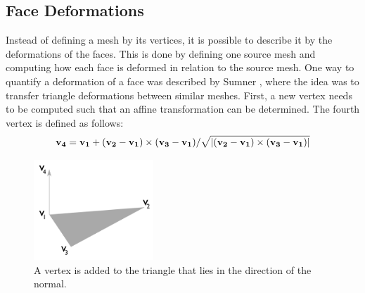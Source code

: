 \subsection{Face Deformations}
\label{faceDeform}
Instead of defining a mesh by its vertices, it is possible to describe it by the deformations of the faces. This is done by defining one source mesh and computing how each face is deformed in relation to the source mesh. One way to quantify a deformation of a face was described by Sumner \cite{sumner2004deformation}, where the idea was to transfer triangle deformations between similar meshes. First, a new vertex needs to be computed such that an affine transformation can be determined. The fourth vertex is defined as follows:
\begin{gather}
  \mathbf{v_4} = \mathbf{v_1} + (\mathbf{v_2} - \mathbf{v_1})\times(\mathbf{v_3}-\mathbf{v_1})/\sqrt{\lvert(\mathbf{v_2}-\mathbf{v_1})\times(\mathbf{v_3}-\mathbf{v_1})\rvert} \label{normalequation}
\end{gather}
\begin{figure}[h]
\centering
\includegraphics[width=0.4\textwidth]{figures/normal}
\caption[Diagram point on normal]{A vertex is added to the triangle that lies in the direction of the normal.}
\label{fig:normal}
\end{figure}

